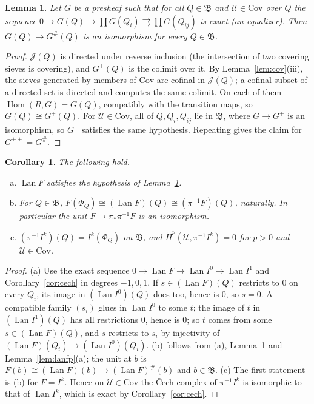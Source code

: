 \documentclass[11pt]{article}
\newtheorem{lemma}[theorem]{Lemma}
\newtheorem{corollary}[theorem]{Corollary}
\theoremstyle{definition}
\theoremstyle{remark}
\newcommand{\Hom}{\operatorname{Hom}}
\newcommand{\Lan}{\operatorname{Lan}}
\newcommand{\Cov}{\mathrm{Cov}}
\newcommand{\fB}{\mathfrak{B}}
\newcommand{\cJ}{\mathcal{J}}
\newcommand{\cU}{\mathcal{U}}
\begin{document}
\begin{lemma}\label{lem:plus}
Let $G$ be a presheaf such that for all $Q\in\fB$ and $\cU\in\Cov$ over $Q$ the sequence $0\to G(Q)\to\prod G(Q_i)\rightrightarrows\prod G(Q_{ij})$ is exact (an equalizer). Then $G(Q)\to G^\#(Q)$ is an isomorphism for every $Q\in\fB$.
\end{lemma}
\begin{proof}
$\cJ(Q)$ is directed under reverse inclusion (the intersection of two covering sieves is covering), and $G^+(Q)$ is the colimit over it. By Lemma~\ref{lem:cov}(iii), the sieves generated by members of $\Cov$ are cofinal in $\cJ(Q)$; a cofinal subset of a directed set is directed and computes the same colimit. On each of them $\Hom(R,G)=G(Q)$, compatibly with the transition maps, so $G(Q)\cong G^+(Q)$. For $\cU\in\Cov$, all of $Q,Q_i,Q_{ij}$ lie in $\fB$, where $G\to G^+$ is an isomorphism, so $G^+$ satisfies the same hypothesis. Repeating gives the claim for $G^{++}=G^\#$.
\end{proof}

\begin{corollary}\label{cor:unit}
The following hold.
\begin{enumerate}[(a)]
\item $\Lan F$ satisfies the hypothesis of Lemma~\ref{lem:plus}.
\item For $Q\in\fB$, $F(\Phi_Q)\cong(\Lan F)(Q)\cong(\pi^{-1}F)(Q)$, naturally. In particular the unit $F\to\pi_*\pi^{-1}F$ is an isomorphism.
\item $(\pi^{-1}I^k)(Q)=I^k(\Phi_Q)$ on $\fB$, and $\check H^p(\cU,\pi^{-1}I^k)=0$ for $p>0$ and $\cU\in\Cov$.
\end{enumerate}
\end{corollary}
\begin{proof}
(a) Use the exact sequence $0\to\Lan F\to\Lan I^0\to\Lan I^1$ and Corollary~\ref{cor:cech} in degrees $-1,0,1$. If $s\in(\Lan F)(Q)$ restricts to $0$ on every $Q_i$, its image in $(\Lan I^0)(Q)$ does too, hence is $0$, so $s=0$. A compatible family $(s_i)$ glues in $\Lan I^0$ to some $t$; the image of $t$ in $(\Lan I^1)(Q)$ has all restrictions $0$, hence is $0$; so $t$ comes from some $s\in(\Lan F)(Q)$, and $s$ restricts to $s_i$ by injectivity of $(\Lan F)(Q_i)\to(\Lan I^0)(Q_i)$.
(b) follows from (a), Lemma~\ref{lem:plus} and Lemma~\ref{lem:lanfp}(a); the unit at $b$ is $F(b)\cong(\Lan F)(b)\to(\Lan F)^\#(b)$ and $b\in\fB$.
(c) The first statement is (b) for $F=I^k$. Hence on $\cU\in\Cov$ the Čech complex of $\pi^{-1}I^k$ is isomorphic to that of $\Lan I^k$, which is exact by Corollary~\ref{cor:cech}.
\end{proof}
\end{document}
